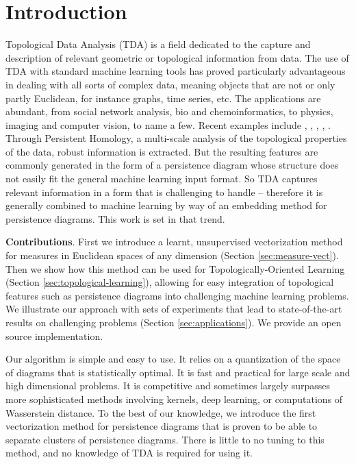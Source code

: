 \documentclass[twoside]{article}
\begin{document}
\section{Introduction}
\label{sec:intro}

Topological Data Analysis (TDA) is a field dedicated to the capture and description of relevant geometric or topological information from data. The use of TDA with standard machine learning tools has proved particularly advantageous in dealing with all sorts of complex data, meaning objects that are not or only partly Euclidean, for instance graphs, time series, etc. The applications are abundant, from social network analysis, bio and chemoinformatics, to physics, imaging and computer vision, to name a few. Recent examples include \cite{dindin20}, \cite{pike20}, \cite{duponchel18}, \cite{cole19}, \cite{KHASAWNEH18}. Through Persistent Homology, a multi-scale analysis of the topological properties of the data, robust information is extracted. But the resulting features are commonly generated in the form of a persistence diagram whose structure does not easily fit the general machine learning input format. So TDA captures relevant information in a form that is challenging to handle \--- therefore it is generally combined to machine learning by way of an embedding method for persistence diagrams. This work is set in that trend. 

\noindent
\textbf{Contributions}. First we introduce a learnt, unsupervised vectorization method for measures in Euclidean spaces of any dimension (Section \ref{sec:measure-vect}). Then we show how this method can be used for Topologically-Oriented Learning (Section \ref{sec:topological-learning}), allowing for easy integration of topological features such as persistence diagrams into challenging machine learning problems. We illustrate our approach with sets of experiments that lead to state-of-the-art results on challenging problems (Section \ref{sec:applications}). We provide an open source implementation.

Our algorithm is simple and easy to use. It relies on a quantization of the space of diagrams that is statistically optimal. It is fast and practical for large scale and high dimensional problems. It is competitive and sometimes largely surpasses more sophisticated methods involving kernels, deep learning, or computations of Wasserstein distance. To the best of our knowledge, we introduce the first vectorization method for persistence diagrams that is proven to be able to separate clusters of persistence diagrams. There is little to no tuning to this method, and no knowledge of TDA is required for using it.
\end{document}
